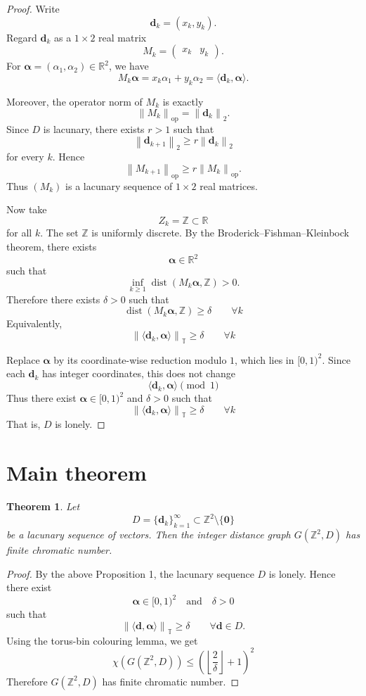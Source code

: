 \documentclass[11pt,fleqn]{article}
\newtheorem{theorem}{Theorem}
\newcommand{\Z}{\mathbb{Z}}
\newcommand{\R}{\mathbb{R}}
\newcommand{\T}{\mathbb{T}}
\newcommand{\norm}[1]{\left\|#1\right\|}
\newcommand{\floor}[1]{\left\lfloor#1\right\rfloor}
\newcommand{\dist}{\operatorname{dist}}
\begin{document}
\begin{proof}
Write
\[
\mathbf d_k=(x_k,y_k).
\]
Regard $\mathbf d_k$ as a $1\times 2$ real matrix
\[
M_k=
\begin{pmatrix}
x_k & y_k
\end{pmatrix}.
\]
For $\boldsymbol\alpha=(\alpha_1,\alpha_2)\in \R^2$, we have
\[
M_k\boldsymbol\alpha
=
x_k\alpha_1+y_k\alpha_2
=
\langle \mathbf d_k,\boldsymbol\alpha\rangle.
\]

Moreover, the operator norm of $M_k$ is exactly
\[
\norm{M_k}_{\operatorname{op}}
=
\norm{\mathbf d_k}_2.
\]
Since $D$ is lacunary, there exists $r>1$ such that
\[
\norm{\mathbf d_{k+1}}_2
\ge
r\norm{\mathbf d_k}_2
\]
for every $k$. Hence
\[
\norm{M_{k+1}}_{\operatorname{op}}
\ge
r\norm{M_k}_{\operatorname{op}}.
\]
Thus $(M_k)$ is a lacunary sequence of $1\times 2$ real matrices.

Now take
\[
Z_k=\Z\subset \R
\]
for all $k$. The set $\Z$ is uniformly discrete. By the Broderick--Fishman--Kleinbock theorem, there exists
\[
\boldsymbol\alpha\in \R^2
\]
such that
\[
\inf_{k\ge 1}\dist(M_k\boldsymbol\alpha,\Z)>0.
\]
Therefore there exists $\delta>0$ such that
\[
\dist(M_k\boldsymbol\alpha,\Z)\ge \delta
\qquad
\forall k
\]
Equivalently,
\[
\norm{\langle \mathbf d_k,\boldsymbol\alpha\rangle}_{\T}\ge \delta
\qquad
\forall k
\]

Replace $\boldsymbol\alpha$ by its coordinate-wise reduction modulo $1$, which lies in $[0,1)^2$. Since each $\mathbf d_k$ has integer coordinates, this does not change
\[
\langle \mathbf d_k,\boldsymbol\alpha\rangle \pmod 1
\]
Thus there exist $\boldsymbol\alpha\in [0,1)^2$ and $\delta>0$ such that
\[
\norm{\langle \mathbf d_k,\boldsymbol\alpha\rangle}_{\T}\ge \delta
\qquad
\forall k
\]
That is, $D$ is lonely.
\end{proof}

\section{Main theorem}

\begin{theorem}
Let
\[
D=\{\mathbf d_k\}_{k=1}^{\infty}\subset \Z^2\setminus\{\mathbf 0\}
\]
be a lacunary sequence of vectors. Then the integer distance graph $G(\Z^2,D)$ has finite chromatic number.
\end{theorem}

\begin{proof}
By the above Proposition 1, the lacunary sequence $D$ is lonely. Hence there exist
\[
\boldsymbol\alpha\in [0,1)^2
\quad\text{and}\quad
\delta>0
\]
such that
\[
\norm{\langle \mathbf d,\boldsymbol\alpha\rangle}_{\T}\ge \delta
\qquad
\forall \mathbf d\in D.
\]
Using the torus-bin colouring lemma, we get
\[
\chi(G(\Z^2,D))
\le
\left(\floor{\frac{2}{\delta}}+1\right)^2
\]
Therefore $G(\Z^2,D)$ has finite chromatic number.
\end{proof}
\end{document}
